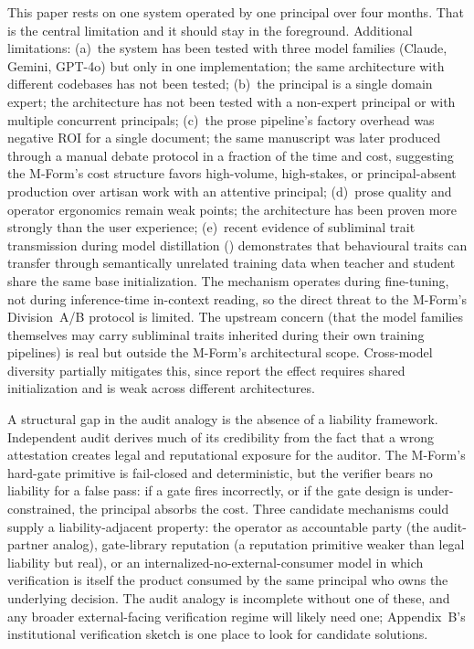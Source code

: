 \documentclass[11pt]{article}
\begin{document}
This paper rests on one system operated by one principal over four months. That is the central limitation and it should stay in the foreground. Additional limitations: (a)~the system has been tested with three model families (Claude, Gemini, GPT-4o) but only in one implementation; the same architecture with different codebases has not been tested; (b)~the principal is a single domain expert; the architecture has not been tested with a non-expert principal or with multiple concurrent principals; (c)~the prose pipeline's factory overhead was negative ROI for a single document; the same manuscript was later produced through a manual debate protocol in a fraction of the time and cost, suggesting the M-Form's cost structure favors high-volume, high-stakes, or principal-absent production over artisan work with an attentive principal; (d)~prose quality and operator ergonomics remain weak points; the architecture has been proven more strongly than the user experience; (e)~recent evidence of subliminal trait transmission during model distillation (\citealt{cloud2026}) demonstrates that behavioural traits can transfer through semantically unrelated training data when teacher and student share the same base initialization. The mechanism operates during fine-tuning, not during inference-time in-context reading, so the direct threat to the M-Form's Division~A/B protocol is limited. The upstream concern (that the model families themselves may carry subliminal traits inherited during their own training pipelines) is real but outside the M-Form's architectural scope. Cross-model diversity partially mitigates this, since \citet{cloud2026} report the effect requires shared initialization and is weak across different architectures.

A structural gap in the audit analogy is the absence of a liability framework. Independent audit derives much of its credibility from the fact that a wrong attestation creates legal and reputational exposure for the auditor. The M-Form's hard-gate primitive is fail-closed and deterministic, but the verifier bears no liability for a false pass: if a gate fires incorrectly, or if the gate design is under-constrained, the principal absorbs the cost. Three candidate mechanisms could supply a liability-adjacent property: the operator as accountable party (the audit-partner analog), gate-library reputation (a reputation primitive weaker than legal liability but real), or an internalized-no-external-consumer model in which verification is itself the product consumed by the same principal who owns the underlying decision. The audit analogy is incomplete without one of these, and any broader external-facing verification regime will likely need one; Appendix~B's institutional verification sketch is one place to look for candidate solutions.
\end{document}
